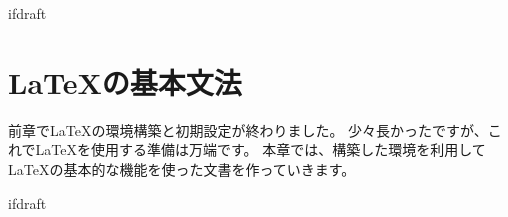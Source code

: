 \expandafter\ifx\csname ifdraft\endcsname\relax
    
    \graphicspath{{./figure/}}

\fi

\chapter{\LaTeX の基本文法}
    前章で\LaTeX の環境構築と初期設定が終わりました。
    少々長かったですが、これで\LaTeX を使用する準備は万端です。
    本章では、構築した環境を利用して\LaTeX の基本的な機能を使った文書を作っていきます。

			\expandafter\ifx\csname ifdraft\endcsname\relax

\fi